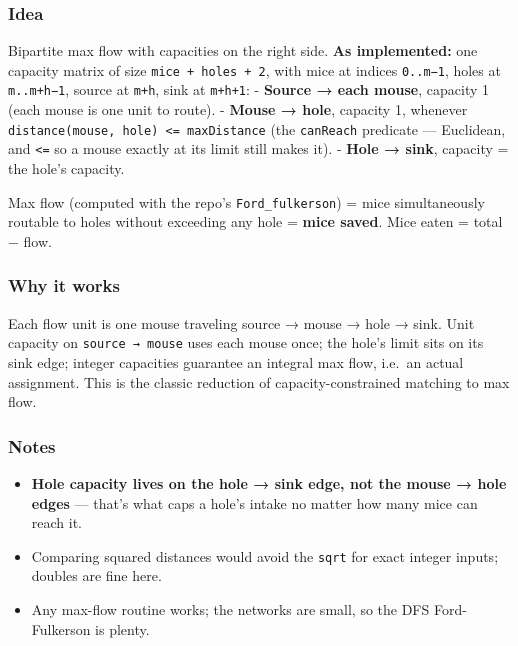 \documentclass[
  10pt,
  letterpaper,
  onecolumn]{article}
\providecommand{\tightlist}{%
  \setlength{\itemsep}{0pt}\setlength{\parskip}{0pt}}
\begin{document}
\hypertarget{idea-20}{%
\subsubsection{Idea}\label{idea-20}}

Bipartite max flow with capacities on the right side. \textbf{As
implemented:} one capacity matrix of size \texttt{mice\ +\ holes\ +\ 2},
with mice at indices \texttt{0..m−1}, holes at \texttt{m..m+h−1}, source
at \texttt{m+h}, sink at \texttt{m+h+1}: - \textbf{Source → each mouse},
capacity 1 (each mouse is one unit to route). - \textbf{Mouse → hole},
capacity 1, whenever
\texttt{distance(mouse,\ hole)\ \textless{}=\ maxDistance} (the
\texttt{canReach} predicate --- Euclidean, and \texttt{\textless{}=} so
a mouse exactly at its limit still makes it). - \textbf{Hole → sink},
capacity = the hole's capacity.

Max flow (computed with the repo's \texttt{Ford\_fulkerson}) = mice
simultaneously routable to holes without exceeding any hole =
\textbf{mice saved}. Mice eaten = total − flow.

\hypertarget{why-it-works}{%
\subsubsection{Why it works}\label{why-it-works}}

Each flow unit is one mouse traveling source → mouse → hole → sink. Unit
capacity on \texttt{source\ →\ mouse} uses each mouse once; the hole's
limit sits on its sink edge; integer capacities guarantee an integral
max flow, i.e.~an actual assignment. This is the classic reduction of
capacity-constrained matching to max flow.

\hypertarget{notes-18}{%
\subsubsection{Notes}\label{notes-18}}

\begin{itemize}
\tightlist
\item
  \textbf{Hole capacity lives on the hole → sink edge, not the mouse →
  hole edges} --- that's what caps a hole's intake no matter how many
  mice can reach it.
\item
  Comparing squared distances would avoid the \texttt{sqrt} for exact
  integer inputs; doubles are fine here.
\item
  Any max-flow routine works; the networks are small, so the DFS
  Ford-Fulkerson is plenty.
\end{itemize}
\end{document}

